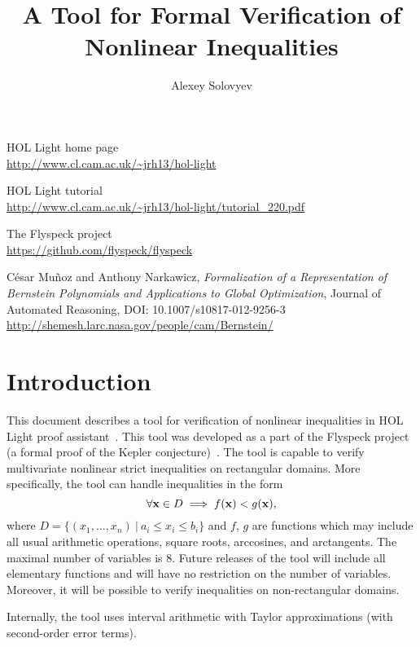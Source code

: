 \documentclass[a4paper]{article}
\title{A Tool for Formal Verification of Nonlinear Inequalities}
\author{Alexey Solovyev}
\begin{document}
\maketitle

\tableofcontents

\pagebreak
\begin{thebibliography}{9}
 HOL Light home page\\
        \url{http://www.cl.cam.ac.uk/~jrh13/hol-light}

 HOL Light tutorial\\
        \url{http://www.cl.cam.ac.uk/~jrh13/hol-light/tutorial_220.pdf}

 The Flyspeck project\\
        \url{https://github.com/flyspeck/flyspeck}

C\'esar Mu\~noz and Anthony Narkawicz, {\it Formalization of a Representation of Bernstein Polynomials and Applications to Global Optimization}, Journal of Automated Reasoning, DOI: 10.1007/s10817-012-9256-3\\
        \url{http://shemesh.larc.nasa.gov/people/cam/Bernstein/}
\end{thebibliography}

\section{Introduction}
This document describes a tool for verification of nonlinear inequalities in HOL Light proof assistant~\cite{HOL, HOL-tutorial}. This tool was developed as a part of the Flyspeck project (a formal proof of the Kepler conjecture)~\cite{flyspeck}. The tool is capable to verify multivariate nonlinear strict inequalities on rectangular domains. More specifically, the tool can handle inequalities in the form
\[\forall {\bf x} \in D \implies f({\bf x}) < g({\bf x}),\]
where $D = \{(x_1, \ldots, x_n)\ |\ a_i \le x_i \le b_i\}$ and $f$, $g$ are functions which may include all usual arithmetic operations, square roots, arccosines, and arctangents. The maximal number of variables is 8. Future releases of the tool will include all elementary functions and will have no restriction on the number of variables. Moreover, it will be possible to verify inequalities on non-rectangular domains.

Internally, the tool uses interval arithmetic with Taylor approximations (with second-order error terms).
\end{document}
